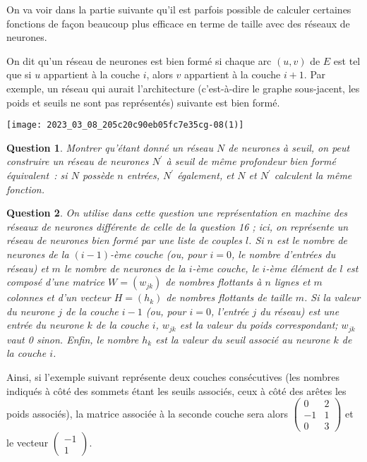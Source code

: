 \documentclass[10pt]{article}
\newtheorem{question}{Question}
\begin{document}
On va voir dans la partie suivante qu'il est parfois possible de calculer certaines fonctions de façon beaucoup plus efficace en terme de taille avec des réseaux de neurones.

On dit qu'un réseau de neurones est bien formé si chaque arc $(u, v)$ de $E$ est tel que si $u$ appartient à la couche $i$, alors $v$ appartient à la couche $i+1$. Par exemple, un réseau qui aurait l'architecture (c'est-à-dire le graphe sous-jacent, les poids et seuils ne sont pas représentés) suivante est bien formé.

\begin{center}
\texttt{[image: 2023\_03\_08\_205c20c90eb05fc7e35cg-08(1)]}
\end{center}

\begin{question}
	Montrer qu'étant donné un réseau $N$ de neurones à seuil, on peut construire un réseau de neurones $N^{\prime}$ à seuil de même profondeur bien formé équivalent : si $N$ possède $n$ entrées, $N^{\prime}$ également, et $N$ et $N^{\prime}$ calculent la même fonction.
\end{question}

\begin{question}
	On utilise dans cette question une représentation en machine des réseaux de neurones différente de celle de la question 16 ; ici, on représente un réseau de neurones bien formé par une liste de couples $l$. Si $n$ est le nombre de neurones de la $(i-1)$-ème couche (ou, pour $i=0$, le nombre d'entrées du réseau) et $m$ le nombre de neurones de la $i$-ème couche, le $i$-ème élément de $l$ est composé d'une matrice $W=\left(w_{j k}\right)$ de nombres flottants à $n$ lignes et $m$ colonnes et d'un vecteur $H=\left(h_{k}\right)$ de nombres flottants de taille $m$. Si la valeur du neurone $j$ de la couche $i-1$ (ou, pour $i=0$, l'entrée $j$ du réseau) est une entrée du neurone $k$ de la couche $i$, $w_{j k}$ est la valeur du poids correspondant; $w_{j k}$ vaut 0 sinon. Enfin, le nombre $h_{k}$ est la valeur du seuil associé au neurone $k$ de la couche $i$.
\end{question}

Ainsi, si l'exemple suivant représente deux couches consécutives (les nombres indiqués à côté des sommets étant les seuils associés, ceux à côté des arêtes les poids associés), la matrice associée à la seconde couche sera alors $\left(\begin{array}{cc}0 & 2 \\ -1 & 1 \\ 0 & 3\end{array}\right)$ et le vecteur $\left(\begin{array}{c}-1 \\ 1\end{array}\right)$.
\end{document}
